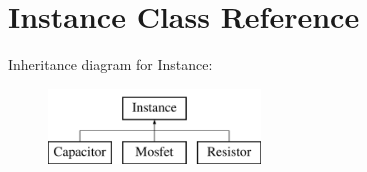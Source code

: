\hypertarget{class_s_p_i_c_e_1_1_instance}{\section{Instance Class Reference}
\label{class_s_p_i_c_e_1_1_instance}
}
Inheritance diagram for Instance\-:\begin{figure}[H]
\begin{center}
\leavevmode
\includegraphics[height=2.000000cm]{class_s_p_i_c_e_1_1_instance}
\end{center}
\end{figure}
